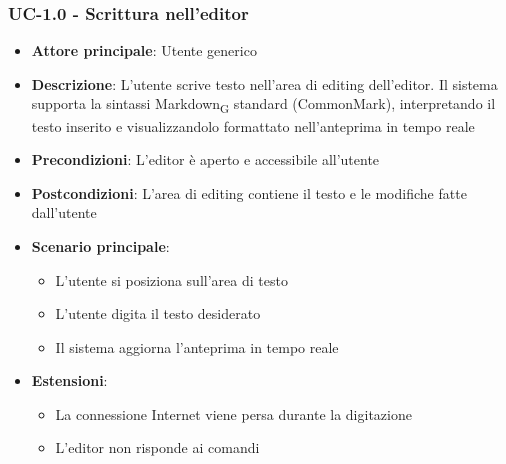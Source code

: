 \documentclass[11pt,a4paper]{article}
\newcommand{\gls}[1]{#1\textsubscript{G}}
\begin{document}
\subsubsection{UC-1.0 - Scrittura nell'editor}
\begin{itemize}
    \item \textbf{Attore principale}: Utente generico
    \item \textbf{Descrizione}: L'utente scrive testo nell'area di editing dell'editor. Il sistema supporta la sintassi \gls{Markdown} standard (CommonMark), interpretando il testo inserito e visualizzandolo formattato nell'anteprima in tempo reale
    \item \textbf{Precondizioni}: L'editor è aperto e accessibile all'utente
    \item \textbf{Postcondizioni}: L’area di editing contiene il testo e le modifiche fatte dall’utente
    \item \textbf{Scenario principale}:
        \begin{itemize}
            \item L’utente si posiziona sull’area di testo
            \item L'utente digita il testo desiderato
            \item Il sistema aggiorna l'anteprima in tempo reale
        \end{itemize}
    \item \textbf{Estensioni}:
        \begin{itemize}
            \item La connessione Internet viene persa durante la digitazione
            \item L'editor non risponde ai comandi
        \end{itemize}
\end{itemize}
\end{document}
